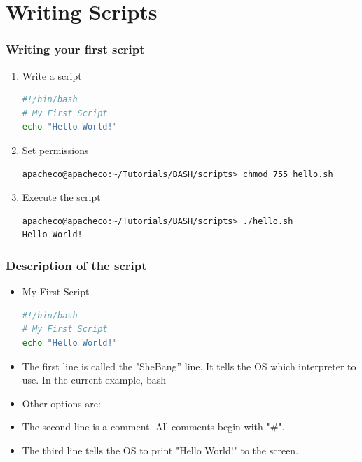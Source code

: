 \documentclass[c,compress,xcolor=svgnames]{beamer}
\begin{document}
\section{Writing Scripts}
\begin{frame}[fragile]
  \frametitle{\small Writing your first script}
  \begin{enumerate}
    \item Write a script
      \begin{lstlisting}[language=bash,basicstyle=\scriptsize\ttfamily]
#!/bin/bash
# My First Script
echo "Hello World!"
      \end{lstlisting}
    \item Set permissions
      \begin{Verbatim}[fontsize=\scriptsize,formatcom=\color{indigo}]
apacheco@apacheco:~/Tutorials/BASH/scripts> chmod 755 hello.sh 
      \end{Verbatim}
    \item Execute the script
      \begin{Verbatim}[fontsize=\scriptsize,formatcom=\color{indigo}]
apacheco@apacheco:~/Tutorials/BASH/scripts> ./hello.sh 
Hello World!
      \end{Verbatim}
  \end{enumerate}
\end{frame}

\begin{frame}[fragile]
  \frametitle{\small Description of the script}
  \begin{itemize}
    \item My First Script
      \begin{lstlisting}[language=bash]
#!/bin/bash
# My First Script
echo "Hello World!"
  \end{lstlisting}
    \item The first line is called the "SheBang'' line. It tells the OS which interpreter to use. In the current example, bash
    \item Other options are:
    \item The second line is a comment. All comments begin with "\#".
    \item The third line tells the OS to print "Hello World!" to the screen.
  \end{itemize}
\end{frame}
\end{document}

